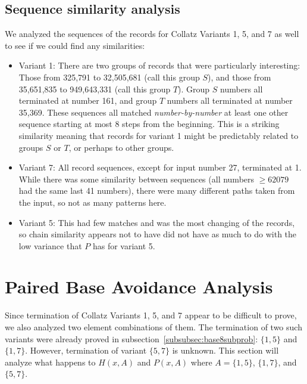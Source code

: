 \subsection{Sequence similarity analysis} \label{subsubsec:algseqsim}
We analyzed the sequences of the records for Collatz Variants 1, 5, and 7 as well to see if we could find any similarities:
\begin{itemize}
    \item Variant 1: There are two groups of records that were particularly interesting: Those from 325,791 to 32,505,681 (call this group $S$), and those from 35,651,835 to 949,643,331 (call this group $T$). Group $S$ numbers all terminated at number 161, and group $T$ numbers all terminated at number 35,369. These sequences all matched \textit{number-by-number} at least one other sequence starting at most 8 steps from the beginning. This is a striking similarity meaning that records for variant 1 might be predictably related to groups $S$ or $T$, or perhaps to other groups.
    \item Variant 7: All record sequences, except for input number 27, terminated at 1. While there was some similarity between sequences (all numbers $\geq 62079$ had the same last 41 numbers), there were many different paths taken from the input, so not as many patterns here.
    \item Variant 5: This had few matches and was the most changing of the records, so chain similarity appears not to have did not have as much to do with the low variance that $P$ has for variant 5.
\end{itemize}
\section{Paired Base Avoidance Analysis} \label{subsec:algpairedbase}
Since termination of Collatz Variants 1, 5, and 7 appear to be difficult to prove, we also analyzed two element combinations of them. The termination of two such variants were already proved in subsection~\ref{subsubsec:base8subprob}: $\{1,5\}$ and $\{1,7\}$. However, termination of variant $\{5,7\}$ is unknown. This section will analyze what happens to $H(x,A)$ and $P(x,A)$ where $A=\{1,5\}$, $\{1,7\}$, and $\{5,7\}$.

